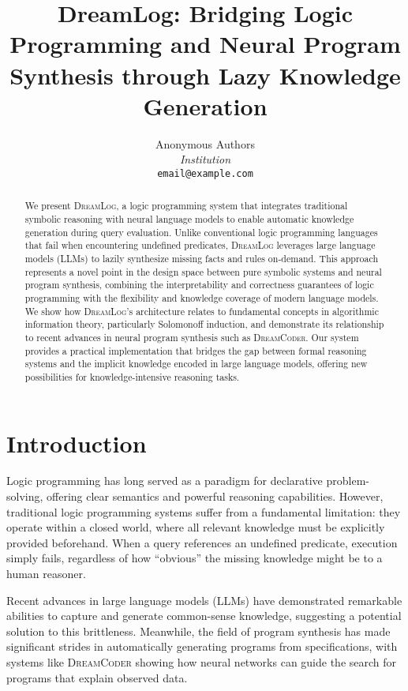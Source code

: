 \documentclass[11pt,a4paper]{article}
\title{DreamLog: Bridging Logic Programming and Neural Program Synthesis through Lazy Knowledge Generation}
\author{
Anonymous Authors\\
\textit{Institution}\\
\texttt{email@example.com}
}
\date{}
\newcommand{\dreamlog}{\textsc{DreamLog}}
\newcommand{\dreamcoder}{\textsc{DreamCoder}}
\begin{document}
\maketitle

\begin{abstract}
We present \dreamlog{}, a logic programming system that integrates traditional symbolic reasoning with neural language models to enable automatic knowledge generation during query evaluation. Unlike conventional logic programming languages that fail when encountering undefined predicates, \dreamlog{} leverages large language models (LLMs) to lazily synthesize missing facts and rules on-demand. This approach represents a novel point in the design space between pure symbolic systems and neural program synthesis, combining the interpretability and correctness guarantees of logic programming with the flexibility and knowledge coverage of modern language models. We show how \dreamlog{}'s architecture relates to fundamental concepts in algorithmic information theory, particularly Solomonoff induction, and demonstrate its relationship to recent advances in neural program synthesis such as \dreamcoder{}. Our system provides a practical implementation that bridges the gap between formal reasoning systems and the implicit knowledge encoded in large language models, offering new possibilities for knowledge-intensive reasoning tasks.
\end{abstract}

\section{Introduction}

Logic programming has long served as a paradigm for declarative problem-solving, offering clear semantics and powerful reasoning capabilities. However, traditional logic programming systems suffer from a fundamental limitation: they operate within a closed world, where all relevant knowledge must be explicitly provided beforehand. When a query references an undefined predicate, execution simply fails, regardless of how ``obvious'' the missing knowledge might be to a human reasoner.

Recent advances in large language models (LLMs) have demonstrated remarkable abilities to capture and generate common-sense knowledge, suggesting a potential solution to this brittleness. Meanwhile, the field of program synthesis has made significant strides in automatically generating programs from specifications, with systems like \dreamcoder{} \citep{ellis2021dreamcoder} showing how neural networks can guide the search for programs that explain observed data.
\end{document}
